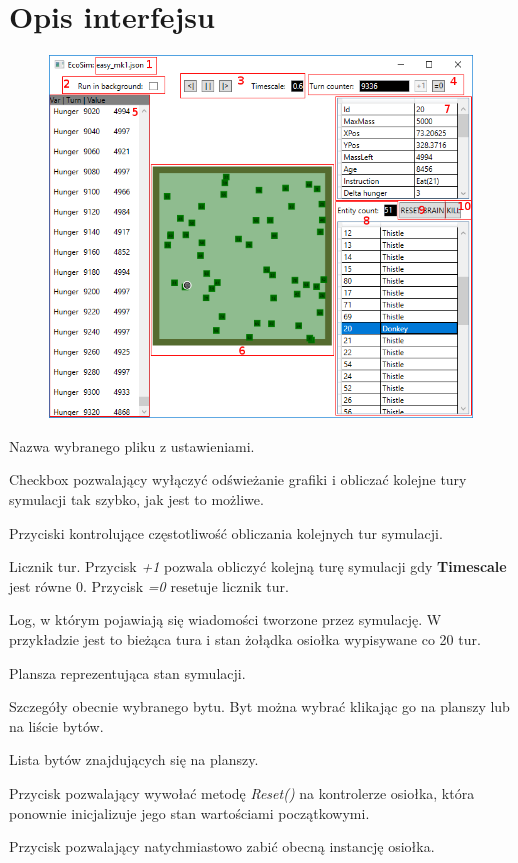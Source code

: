 \section{Opis interfejsu}
\begin{figure}[H]
    \centering
    \includegraphics[scale=0.55]{Chapters/interface_annotated}
    \end{figure}
\begin{interface_descs}
    \item Nazwa wybranego pliku z ustawieniami.
    \item Checkbox pozwalający wyłączyć odświeżanie grafiki i obliczać kolejne tury symulacji tak szybko, jak jest to możliwe.
    \item Przyciski kontrolujące częstotliwość obliczania kolejnych tur symulacji.
    \item Licznik tur. Przycisk \textit{+1} pozwala obliczyć kolejną turę symulacji gdy \textbf{Timescale} jest równe 0. Przycisk \textit{=0} resetuje licznik tur.
    \item Log, w którym pojawiają się wiadomości tworzone przez symulację. W przykładzie jest to bieżąca tura i stan żołądka osiołka wypisywane co 20 tur.
    \item Plansza reprezentująca stan symulacji.
    \item Szczegóły obecnie wybranego bytu. Byt można wybrać klikając go na planszy lub na liście bytów.
    \item Lista bytów znajdujących się na planszy.
    \item Przycisk pozwalający wywołać metodę \textit{Reset()} na kontrolerze osiołka, która ponownie inicjalizuje jego stan wartościami początkowymi.
    \item Przycisk pozwalający natychmiastowo zabić obecną instancję osiołka.
\end{interface_descs}

